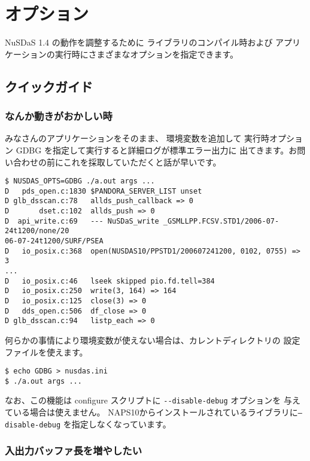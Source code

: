 \section{オプション}
\label{sec:opts}

NuSDaS 1.4 の動作を調整するために
ライブラリのコンパイル時および
アプリケーションの実行時にさまざまなオプションを指定できます。

\subsection{クイックガイド}

\subsubsection{なんか動きがおかしい時}

みなさんのアプリケーションをそのまま、
環境変数を追加して
実行時オプション GDBG を指定して実行すると詳細ログが標準エラー出力に
出てきます。お問い合わせの前にこれを採取していただくと話が早いです。

\begin{screen}
\begin{verbatim}
$ NUSDAS_OPTS=GDBG ./a.out args ...
D   pds_open.c:1830 $PANDORA_SERVER_LIST unset
D glb_dsscan.c:78   allds_push_callback => 0
D       dset.c:102  allds_push => 0
D  api_write.c:69   --- NuSDaS_write _GSMLLPP.FCSV.STD1/2006-07-24t1200/none/20
06-07-24t1200/SURF/PSEA
D   io_posix.c:368  open(NUSDAS10/PPSTD1/200607241200, 0102, 0755) => 3
...
D   io_posix.c:46   lseek skipped pio.fd.tell=384
D   io_posix.c:250  write(3, 164) => 164
D   io_posix.c:125  close(3) => 0
D   dds_open.c:506  df_close => 0
D glb_dsscan.c:94   listp_each => 0
\end{verbatim}
\end{screen}

何らかの事情により環境変数が使えない場合は、カレントディレクトリの
設定ファイルを使えます。

\begin{screen}
\begin{verbatim}
$ echo GDBG > nusdas.ini
$ ./a.out args ...
\end{verbatim}
\end{screen}

なお、この機能は configure スクリプトに \verb|--disable-debug| オプションを
与えている場合は使えません。
NAPS10からインストールされているライブラリに{\tt --disable-debug}
を指定しなくなっています。

\subsubsection{入出力バッファ長を増やしたい}

